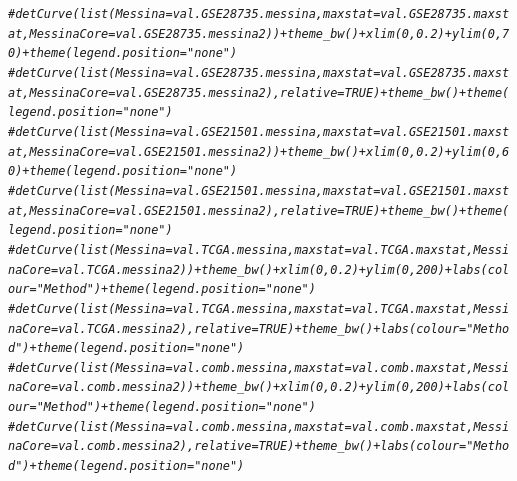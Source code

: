 \documentclass{article}\usepackage[]{graphicx}\usepackage[]{color}
\makeatletter
\newcommand{\hlcom}[1]{\textcolor[rgb]{0.678,0.584,0.686}{\textit{#1}}}%
\newenvironment{kframe}{%
 \def\at@end@of@kframe{}%
 \ifinner\ifhmode%
  \def\at@end@of@kframe{\end{minipage}}%
  \begin{minipage}{\columnwidth}%
 \fi\fi%
 \def\FrameCommand##1{\hskip\@totalleftmargin \hskip-\fboxsep
 \colorbox{shadecolor}{##1}\hskip-\fboxsep
     \hskip-\linewidth \hskip-\@totalleftmargin \hskip\columnwidth}%
 \MakeFramed {\advance\hsize-\width
   \@totalleftmargin\z@ \linewidth\hsize
   \@setminipage}}%
 {\par\unskip\endMakeFramed%
 \at@end@of@kframe}
\newenvironment{knitrout}{}{} %
\makeatother
\begin{document}
\begin{knitrout}
\begin{kframe}
\begin{alltt}
\hlcom{# detCurve(list(Messina = val.GSE28735.messina, maxstat = val.GSE28735.maxstat, MessinaCore = val.GSE28735.messina2)) + theme_bw() + xlim(0, 0.2) + ylim(0, 70) + theme(legend.position = "none")}
\hlcom{# detCurve(list(Messina = val.GSE28735.messina, maxstat = val.GSE28735.maxstat, MessinaCore = val.GSE28735.messina2), relative = TRUE) + theme_bw() + theme(legend.position = "none")}
\hlcom{# detCurve(list(Messina = val.GSE21501.messina, maxstat = val.GSE21501.maxstat, MessinaCore = val.GSE21501.messina2)) + theme_bw() + xlim(0, 0.2) + ylim(0, 60) + theme(legend.position = "none")}
\hlcom{# detCurve(list(Messina = val.GSE21501.messina, maxstat = val.GSE21501.maxstat, MessinaCore = val.GSE21501.messina2), relative = TRUE) + theme_bw() + theme(legend.position = "none")}
\hlcom{# detCurve(list(Messina = val.TCGA.messina, maxstat = val.TCGA.maxstat, MessinaCore = val.TCGA.messina2)) + theme_bw() + xlim(0, 0.2) + ylim(0, 200) + labs(colour = "Method") + theme(legend.position = "none")}
\hlcom{# detCurve(list(Messina = val.TCGA.messina, maxstat = val.TCGA.maxstat, MessinaCore = val.TCGA.messina2), relative = TRUE) + theme_bw() + labs(colour = "Method") + theme(legend.position = "none")}
\hlcom{# detCurve(list(Messina = val.comb.messina, maxstat = val.comb.maxstat, MessinaCore = val.comb.messina2)) + theme_bw() + xlim(0, 0.2) + ylim(0, 200) + labs(colour = "Method") + theme(legend.position = "none")}
\hlcom{# detCurve(list(Messina = val.comb.messina, maxstat = val.comb.maxstat, MessinaCore = val.comb.messina2), relative = TRUE) + theme_bw() + labs(colour = "Method") + theme(legend.position = "none")}


\end{alltt}
\end{kframe}
\end{knitrout}
\end{document}
